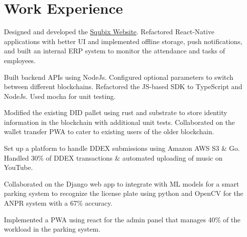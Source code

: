 \documentclass[]{assets/deedy-resume-openfont}
\begin{document}
  \section{Work Experience}
  \hfill {}
      \begin{tightemize}
       \item Designed and developed the {\href{https://squbix.com/}{Squbix Website}}. Refactored React-Native applications with better UI and implemented offline storage, push notifications, and built an internal ERP system to monitor the attendance and tasks of employees.
       \item Built backend APIs using NodeJs. Configured optional parameters to switch between different blockchains. Refactored the JS-based SDK to TypeScript and NodeJs. Used mocha for unit testing.
       \item Modified the existing DID pallet using rust and substrate to store identity information in the blockchain with additional unit tests. Collaborated on the wallet transfer PWA to cater to existing users of the older blockchain.
      \end{tightemize}
      \sectionsep
  \hfill {}
      \begin{tightemize}
    \item Set up a platform to handle DDEX submissions using Amazon AWS S3 \& Go. Handled 30\% of DDEX transactions \& automated uploading of music on YouTube.
\end{tightemize}
      \sectionsep
  \hfill {}
      \begin{tightemize}
    \item Collaborated on the Django web app to integrate with ML models for a smart parking system to recognize the license plate using python and OpenCV for the ANPR system with a 67\% accuracy.
    \item Implemented a PWA using react for the admin panel that manages 40\% of the workload in the parking system.
\end{tightemize}
      \sectionsep
%
%
\end{document}
